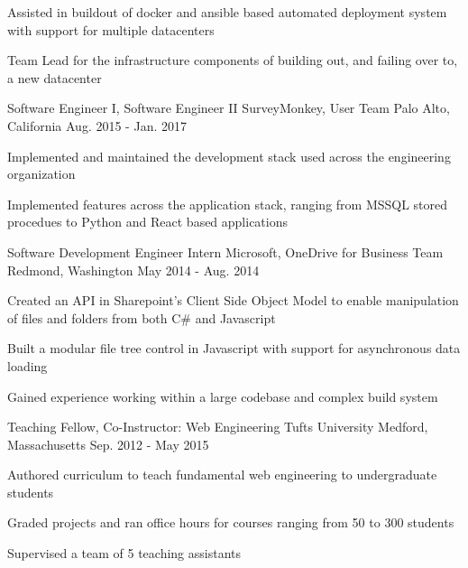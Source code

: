 \begin{cventries}
{\begin{cvitems}
        \item {Assisted in buildout of docker and ansible based automated deployment system with support for multiple datacenters}
        \item {Team Lead for the infrastructure components of building out, and failing over to, a new datacenter}
      \end{cvitems}
    }
  \cventry
    {Software Engineer I, Software Engineer II}
    {SurveyMonkey, User Team}
    {Palo Alto, California}
    {Aug. 2015 - Jan. 2017}
    {
      \begin{cvitems}
        \item {Implemented and maintained the development stack used across the engineering organization}
        \item {Implemented features across the application stack, ranging from MSSQL stored procedues to Python and React based applications}
      \end{cvitems}
    }
  \cventry
    {Software Development Engineer Intern}
    {Microsoft, OneDrive for Business Team}
    {Redmond, Washington}
    {May 2014 - Aug. 2014}
    {
      \begin{cvitems}
        \item {Created an API in Sharepoint's Client Side Object Model to enable manipulation of files and folders from both C\# and Javascript}
        \item {Built a modular file tree control in Javascript with support for asynchronous data loading}
        \item {Gained experience working within a large codebase and complex build system}
      \end{cvitems}
    }
  \cventry
    {Teaching Fellow, Co-Instructor: Web Engineering}
    {Tufts University}
    {Medford, Massachusetts}
    {Sep. 2012 - May 2015}
    {
      \begin{cvitems}
        \item {Authored curriculum to teach fundamental web engineering to undergraduate students}
        \item {Graded projects and ran office hours for courses ranging from 50 to 300 students}
        \item {Supervised a team of 5 teaching assistants}
      \end{cvitems}
    }

\end{cventries}
